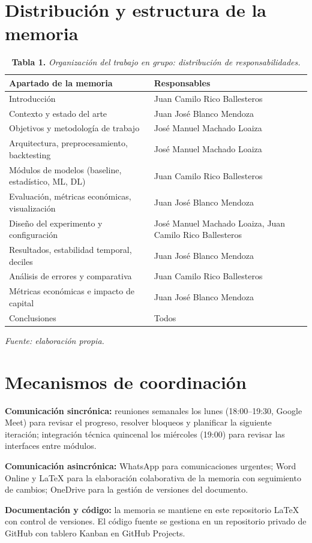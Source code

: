 \section*{Distribución y estructura de la memoria}

\begin{table}[H]
\caption{\textbf{Tabla 1.} \textit{Organización del trabajo en grupo: distribución de responsabilidades.}}
\label{tab:organizacion}
\vspace{4pt}
\begin{tabular}{>{\raggedright\arraybackslash}p{7cm} >{\raggedright\arraybackslash}p{7cm}}
\toprule
\textbf{Apartado de la memoria} & \textbf{Responsables} \\
\midrule
Introducción & Juan Camilo Rico Ballesteros \\
Contexto y estado del arte & Juan José Blanco Mendoza \\
Objetivos y metodología de trabajo & José Manuel Machado Loaiza \\
Arquitectura, preprocesamiento, backtesting & José Manuel Machado Loaiza \\
Módulos de modelos (baseline, estadístico, ML, DL) & Juan Camilo Rico Ballesteros \\
Evaluación, métricas económicas, visualización & Juan José Blanco Mendoza \\
Diseño del experimento y configuración & José Manuel Machado Loaiza, Juan Camilo Rico Ballesteros \\
Resultados, estabilidad temporal, deciles & Juan José Blanco Mendoza \\
Análisis de errores y comparativa & Juan Camilo Rico Ballesteros \\
Métricas económicas e impacto de capital & Juan José Blanco Mendoza \\
Conclusiones & Todos \\
\bottomrule
\end{tabular}
\vspace{4pt}

\small\textit{Fuente: elaboración propia.}
\end{table}

\section*{Mecanismos de coordinación}

\textbf{Comunicación sincrónica:} reuniones semanales los lunes (18:00–19:30, Google Meet) para revisar el progreso, resolver bloqueos y planificar la siguiente iteración; integración técnica quincenal los miércoles (19:00) para revisar las interfaces entre módulos.

\textbf{Comunicación asincrónica:} WhatsApp para comunicaciones urgentes; Word Online y \LaTeX{} para la elaboración colaborativa de la memoria con seguimiento de cambios; OneDrive para la gestión de versiones del documento.

\textbf{Documentación y código:} la memoria se mantiene en este repositorio \LaTeX{} con control de versiones. El código fuente se gestiona en un repositorio privado de GitHub con tablero Kanban en GitHub Projects.
